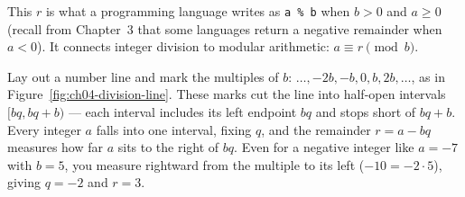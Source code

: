 This $r$ is what a programming language writes as \texttt{a \% b} when $b > 0$ and $a \ge 0$ (recall
from Chapter~3 that some languages return a negative remainder when $a < 0$). It connects integer
division to modular arithmetic: $a \equiv r \pmod{b}$.

\begin{intuitionbox}
Lay out a number line and mark the multiples of $b$: $\dots, -2b, -b, 0, b, 2b, \dots$, as in
Figure~\ref{fig:ch04-division-line}. These marks cut the line into half-open intervals
$[bq, bq+b)$ --- each interval includes its left endpoint $bq$ and stops short of $bq + b$. Every
integer $a$ falls into one interval, fixing $q$, and the remainder $r = a - bq$ measures how far $a$
sits to the right of $bq$. Even for a negative integer like $a = -7$ with $b = 5$, you measure
rightward from the multiple to its left ($-10 = -2 \cdot 5$), giving $q = -2$ and $r = 3$.
\end{intuitionbox}

